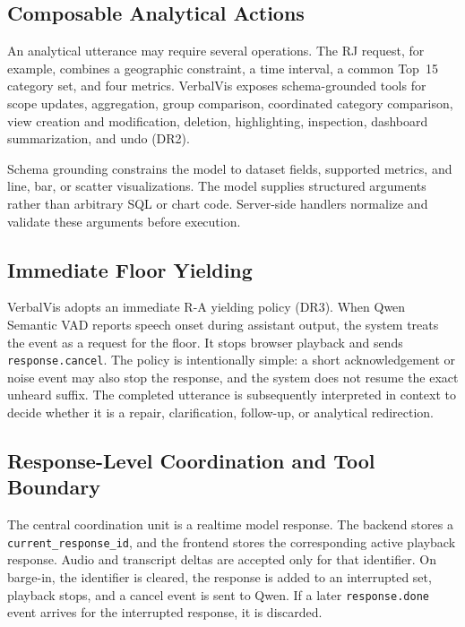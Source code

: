 \documentclass[journal]{IEEEtran}
\begin{document}
\subsection{Composable Analytical Actions}
\label{sec:design-actions}

An analytical utterance may require several operations. The RJ request, for example, combines a geographic constraint, a time interval, a common Top~15 category set, and four metrics. VerbalVis exposes schema-grounded tools for scope updates, aggregation, group comparison, coordinated category comparison, view creation and modification, deletion, highlighting, inspection, dashboard summarization, and undo (DR2).

Schema grounding constrains the model to dataset fields, supported metrics, and line, bar, or scatter visualizations. The model supplies structured arguments rather than arbitrary SQL or chart code. Server-side handlers normalize and validate these arguments before execution.

\subsection{Immediate Floor Yielding}
\label{sec:design-overlap}

VerbalVis adopts an immediate R-A yielding policy (DR3). When Qwen Semantic VAD reports speech onset during assistant output, the system treats the event as a request for the floor. It stops browser playback and sends \texttt{response.cancel}. The policy is intentionally simple: a short acknowledgement or noise event may also stop the response, and the system does not resume the exact unheard suffix. The completed utterance is subsequently interpreted in context to decide whether it is a repair, clarification, follow-up, or analytical redirection.

\subsection{Response-Level Coordination and Tool Boundary}
\label{sec:design-coordination}

The central coordination unit is a realtime model response. The backend stores a \texttt{current\_response\_id}, and the frontend stores the corresponding active playback response. Audio and transcript deltas are accepted only for that identifier. On barge-in, the identifier is cleared, the response is added to an interrupted set, playback stops, and a cancel event is sent to Qwen. If a later \texttt{response.done} event arrives for the interrupted response, it is discarded.
\end{document}
